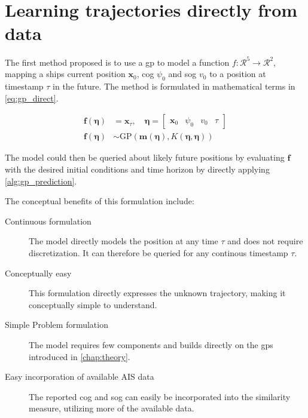 \chapter{Learning trajectories directly from data}
The first method proposed is to use a \acrshort{gp} to model a function $f: \mathcal{R}^5 \to \mathcal{R}^2$, mapping a ships current position $\boldsymbol{x}_0$, \acrshort{cog} $\psi_0$ and \acrshort{sog} $v_0$ to a position at timestamp $\tau$ in the future. The method is formulated in mathematical terms in \cref{eq:gp_direct}. 

\begin{subequations}\label{eq:gp_direct}
\begin{align}
    \boldsymbol{f}(\boldsymbol{\eta}) &= \boldsymbol{x}_{\tau} \label{eq:gp_direct_f}, \quad \boldsymbol{\eta} = \begin{bmatrix} \boldsymbol{x}_0 & \psi_0 & v_0 & \tau\end{bmatrix}\\
    \boldsymbol{f}(\boldsymbol{\eta}) &\sim \text{GP}(\boldsymbol{m}(\boldsymbol{\eta}), K(\boldsymbol{\eta}, \boldsymbol{\eta}))\label{eq:gp_direct_f_dist}
\end{align} 
\end{subequations}

The model could then be queried about likely future positions by evaluating $\boldsymbol{f}$ with the desired initial conditions and time horizon by directly applying \cref{alg:gp_prediction}. 

The conceptual benefits of this formulation include:
\begin{description}
    \item[Continuous formulation] The model directly models the position at any time $\tau$ and does not require discretization. It can therefore be queried for any continous timestamp $\tau$.
    \item[Conceptually easy] This formulation directly expresses the unknown trajectory, making it conceptually simple to understand.
    \item[Simple Problem formulation] The model requires few components and builds directly on the \acrshort{gp}s introduced in \cref{chap:theory}.
    \item[Easy incorporation of available AIS data] The reported \acrshort{cog} and \acrshort{sog} can easily be incorporated into the similarity measure, utilizing more of the available data.
\end{description}

